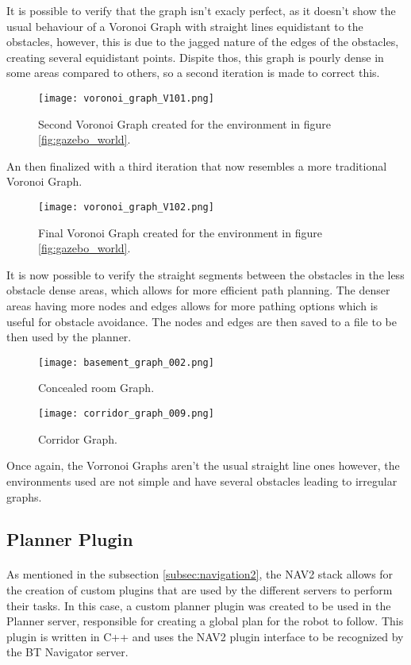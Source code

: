 It is possible to verify that the graph isn't exacly perfect, as it doesn't 
show the usual behaviour of a Voronoi Graph with straight lines equidistant to the 
obstacles, however, this is due to the jagged nature of the edges of the obstacles, creating 
several equidistant points. Dispite thos, this graph is pourly dense in some 
areas compared to others, so a second iteration is made to correct this.
\begin{figure}[h]
    \centering
    \texttt{[image: voronoi\_graph\_V101.png]}
    \caption{Second Voronoi Graph created for the environment in figure \ref{fig:gazebo_world}.}
    \label{fig:voronoi_graph2}
\end{figure}

An then finalized with a third iteration that now resembles a more 
traditional Voronoi Graph.
\begin{figure}[h]
    \centering
    \texttt{[image: voronoi\_graph\_V102.png]}
    \caption{Final Voronoi Graph created for the environment in figure \ref{fig:gazebo_world}.}
    \label{fig:voronoi_graph3}
\end{figure}

It is now possible to verify the straight segments between the obstacles in the 
less obstacle dense areas, which allows for more efficient path planning. The denser areas 
having more nodes and edges allows for more pathing options which is useful 
for obstacle avoidance. The nodes and edges are then saved to a file to be 
then used by the planner.
\begin{figure}[h]
    \centering
    \texttt{[image: basement\_graph\_002.png]}
    \caption{Concealed room Graph.}
    \label{fig:basement_graph_002}
\end{figure}
\begin{figure}[h]
    \centering
    \texttt{[image: corridor\_graph\_009.png]}
    \caption{Corridor Graph.}
    \label{fig:corridor_graph_009}
\end{figure}
\clearpage

Once again, the Vorronoi Graphs aren't the usual straight line ones however, the environments 
used are not simple and have several obstacles leading to irregular graphs.

\subsection{Planner Plugin}
\label{subsec:planner_plugin}
\paragraph{}As mentioned in the subsection \ref{subsec:navigation2}, the \gls{NAV2} stack allows for the creation of custom plugins that are 
used by the different servers to perform their tasks. In this case, a custom planner plugin was 
created to be used in the Planner server, responsible for creating a global plan 
for the robot to follow. This plugin is written in C++ and uses the 
\gls{NAV2} plugin interface to be recognized by the BT Navigator server.

